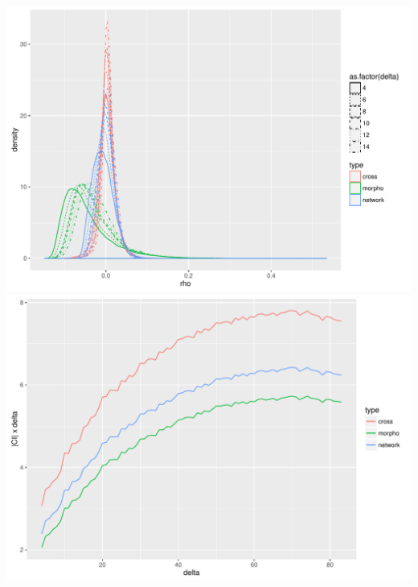 \documentclass[english,11pt]{beamer}
\begin{document}
{\begin{columns}
\centering
\includegraphics[width=\textwidth]{figures/morpho_corrs-distrib_varyingdelta_bytype.pdf}\\
\includegraphics[width=\textwidth]{figures/corr_normalized_CI_delta}
\end{columns}

}
\end{document}
